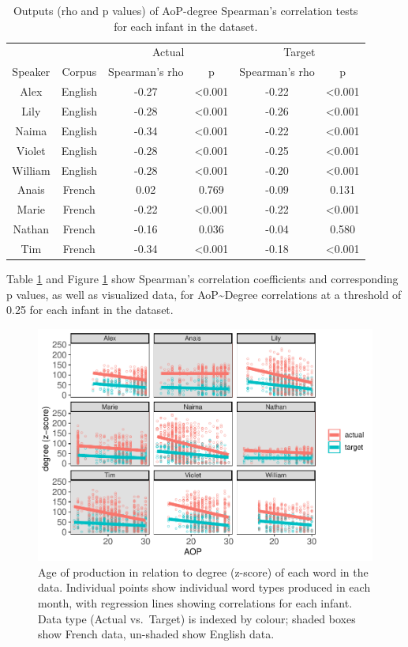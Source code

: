 \documentclass[
  man,floatsintext]{apa6}
\begin{document}
\begin{longtable}[t]{cccccc}
\caption{\label{tab:table-aop-deg-corr}Outputs (rho and p values) of AoP-degree Spearman's correlation tests for each infant in the dataset.}\\
\toprule
\multicolumn{2}{c}{ } & \multicolumn{2}{c}{Actual} & \multicolumn{2}{c}{Target} \\
\cmidrule(l{3pt}r{3pt}){3-4} \cmidrule(l{3pt}r{3pt}){5-6}
Speaker & Corpus & Spearman's rho & p & Spearman's rho & p\\
\midrule
Alex & English & -0.27 & <0.001 & -0.22 & <0.001\\
Lily & English & -0.28 & <0.001 & -0.26 & <0.001\\
Naima & English & -0.34 & <0.001 & -0.22 & <0.001\\
Violet & English & -0.28 & <0.001 & -0.25 & <0.001\\
William & English & -0.28 & <0.001 & -0.20 & <0.001\\
\addlinespace
Anais & French & 0.02 & 0.769 & -0.09 & 0.131\\
Marie & French & -0.22 & <0.001 & -0.22 & <0.001\\
Nathan & French & -0.16 & 0.036 & -0.04 & 0.580\\
Tim & French & -0.34 & <0.001 & -0.18 & <0.001\\
\bottomrule
\end{longtable}

Table \ref{tab:table-aop-deg-corr} and Figure \ref{fig:Figure-AOP-deg-corr} show Spearman's correlation coefficients and corresponding p values, as well as visualized data, for AoP\textasciitilde Degree correlations at a threshold of 0.25 for each infant in the dataset.

\begin{figure}
\centering
\includegraphics{PhonNetworksSupplementaryData-test_files/figure-latex/Figure-AOP-deg-corr-1.pdf}
\caption{\label{fig:Figure-AOP-deg-corr}Age of production in relation to degree (z-score) of each word in the data. Individual points show individual word types produced in each month, with regression lines showing correlations for each infant. Data type (Actual vs.~Target) is indexed by colour; shaded boxes show French data, un-shaded show English data.}
\end{figure}
\end{document}
